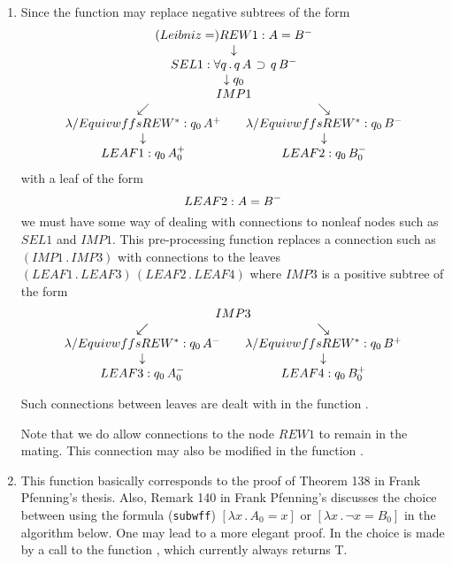 \begin{enumerate}
\item {\bf{}}   Since the
 function may replace negative subtrees of the form
$$\erew{1}{Leibniz=}{A = B^-}{\sel{1}{\forall q \, .\, q\, A\, \limplies\, q\, B^-}
{q_0}{\eimp{1}{q_0\, A\, \limplies \, q_0\, B^-}
{\erewstar{\lambda/Equivwffs}{q_0\, A^+}{\eleaf{1}{q_0\, A_0^+}}}
{\erewstar{\lambda/Equivwffs}{q_0\, B^-}{\eleaf{2}{q_0\, B_0^-}}}}}$$
with a leaf of the form
$$\eleaf{2}{A = B^-}$$
we must have some way of dealing with connections to nonleaf nodes such as $SEL1$
and $IMP1$.
This pre-processing function replaces a connection such as $(IMP1\, .\, IMP3)$
with connections to the leaves $(LEAF1\, .\, LEAF3)\, (LEAF2\, .\, LEAF4)$
where $IMP3$ is a positive subtree of the form
$${\eimp{3}{q\, A\, \limplies \, q\, B^+}
{\erewstar{\lambda/Equivwffs}{q_0\, A^-}{\eleaf{3}{q_0\, A_0^-}}}
{\erewstar{\lambda/Equivwffs}{q_0\, B^+}{\eleaf{4}{q_0\, B_0^+}}}}$$

Such connections between leaves are dealt with in the function .

Note that we do allow connections to the node $REW1$ to remain in the mating.
This connection may also be modified in the function .

\item {\bf{}}  This function
basically corresponds to the proof of Theorem 138
in Frank Pfenning's thesis\cite{Pfenning86}.  
Also, Remark 140 in Frank Pfenning's discusses the choice
between using the formula 
(\verb+subwff+)
$[\lambda x\, . \, A_0 = x]$ or $[\lambda x\, . \, \lnot x = B_0]$
in the algorithm below.  One may lead to a more elegant proof.
In \TPS the choice is made by a call to the function
, which currently
always returns T.


\end{enumerate}

